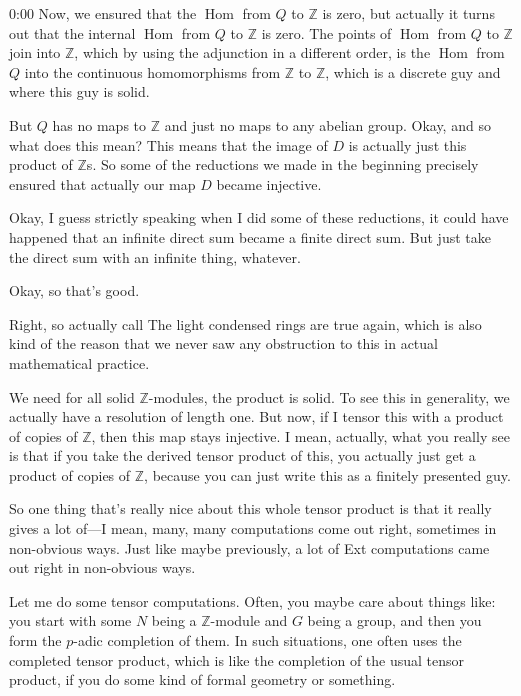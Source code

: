 \begin{unfinished}{0:00}
Now, we ensured that the $\operatorname{Hom}$ from $Q$ to $\mathbb{Z}$ is zero, but actually it turns out that the internal $\operatorname{Hom}$ from $Q$ to $\mathbb{Z}$ is zero. The points of $\operatorname{Hom}$ from $Q$ to $\mathbb{Z}$ join into $\mathbb{Z}$, which by using the adjunction in a different order, is the $\operatorname{Hom}$ from $Q$ into the continuous homomorphisms from $\mathbb{Z}$ to $\mathbb{Z}$, which is a discrete guy and where this guy is solid. 

But $Q$ has no maps to $\mathbb{Z}$ and just no maps to any abelian group. Okay, and so what does this mean? This means that the image of $D$ is actually just this product of $\mathbb{Z}$s. So some of the reductions we made in the beginning precisely ensured that actually our map $D$ became injective.

Okay, I guess strictly speaking when I did some of these reductions, it could have happened that an infinite direct sum became a finite direct sum. But just take the direct sum with an infinite thing, whatever.

Okay, so that's good.

Right, so actually call
The light condensed rings are true again, which is also kind of the reason that we never saw any obstruction to this in actual mathematical practice.

We need for all solid $\mathbb{Z}$-modules, the product is solid. To see this in generality, we actually have a resolution of length one. But now, if I tensor this with a product of copies of $\mathbb{Z}$, then this map stays injective. I mean, actually, what you really see is that if you take the derived tensor product of this, you actually just get a product of copies of $\mathbb{Z}$, because you can just write this as a finitely presented guy.

So one thing that's really nice about this whole tensor product is that it really gives a lot of---I mean, many, many computations come out right, sometimes in non-obvious ways. Just like maybe previously, a lot of Ext computations came out right in non-obvious ways.

Let me do some tensor computations. Often, you maybe care about things like: you start with some $N$ being a $\mathbb{Z}$-module and $G$ being a group, and then you form the $p$-adic completion of them. In such situations, one often uses the completed tensor product, which is like the completion of the usual tensor product, if you do some kind of formal geometry or something.


\end{unfinished}
